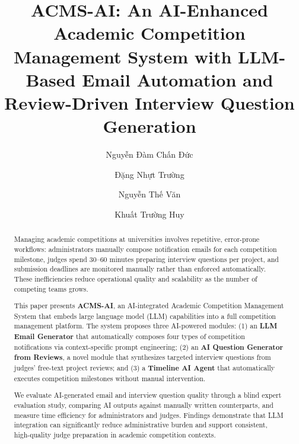 \documentclass[runningheads]{llncs}
\begin{document}
\title{ACMS-AI: An AI-Enhanced Academic Competition Management System with LLM-Based Email Automation and Review-Driven Interview Question Generation}


\author{Nguyễn Đàm Chấn Đức \and
Đặng Nhựt Trường \and
Nguyễn Thế Văn \and
Khuất Trường Huy}



\maketitle

\begin{abstract}
Managing academic competitions at universities involves repetitive, error-prone workflows: administrators manually compose notification emails for each competition milestone, judges spend 30--60 minutes preparing interview questions per project, and submission deadlines are monitored manually rather than enforced automatically. These inefficiencies reduce operational quality and scalability as the number of competing teams grows.

This paper presents \textbf{ACMS-AI}, an AI-integrated Academic Competition Management System that embeds large language model (LLM) capabilities into a full competition management platform. The system proposes three AI-powered modules: (1) an \textbf{LLM Email Generator} that automatically composes four types of competition notifications via context-specific prompt engineering; (2) an \textbf{AI Question Generator from Reviews}, a novel module that synthesizes targeted interview questions from judges' free-text project reviews; and (3) a \textbf{Timeline AI Agent} that automatically executes competition milestones without manual intervention.

We evaluate AI-generated email and interview question quality through a blind expert evaluation study, comparing AI outputs against manually written counterparts, and measure time efficiency for administrators and judges. Findings demonstrate that LLM integration can significantly reduce administrative burden and support consistent, high-quality judge preparation in academic competition contexts.

\end{abstract}
\end{document}
